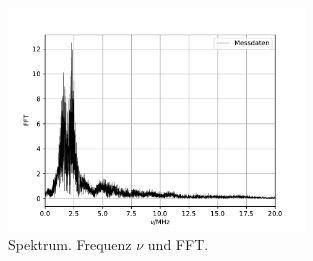 \begin{figure}[H]
  \centering
  \includegraphics[width = 0.7\textwidth]{../Messdaten/plots/spectrum.pdf}
  \caption{Spektrum. Frequenz $\nu$ und FFT.}
  \label{fig: spektrum}
\end{figure}

